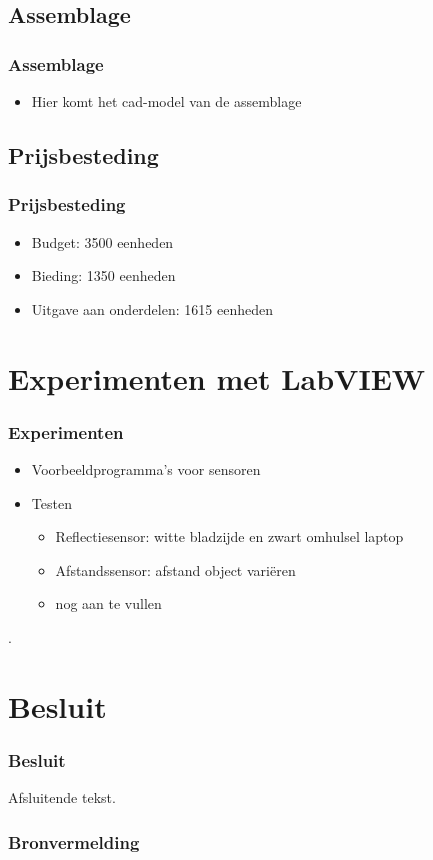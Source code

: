 \documentclass
   [kulak] %
   {kulakbeamer}
\begin{document}
\subsection{Assemblage}
\begin{frame}
	\frametitle{Assemblage}
	\begin{itemize}
		\item Hier komt het cad-model van de assemblage
	\end{itemize}
\end{frame}

\subsection{Prijsbesteding}
\begin{frame}
	\frametitle{Prijsbesteding}
	\begin{itemize}
		\item Budget: 3500 eenheden
		\item Bieding: 1350 eenheden
		\item Uitgave aan onderdelen: 1615 eenheden
	\end{itemize}
\end{frame}



\section[Experimenten]{Experimenten met LabVIEW}

\begin{frame}
	\frametitle{Experimenten}
	\begin{itemize}
		\item Voorbeeldprogramma's voor sensoren
		\item Testen
		\begin{itemize}
			\item Reflectiesensor: witte bladzijde en zwart omhulsel laptop
			\item Afstandssensor: afstand object variëren
			\item nog aan te vullen
		\end{itemize}
	\end{itemize}.
\end{frame}



\section{Besluit}
\begin{frame}
\frametitle{Besluit}
Afsluitende tekst.
\end{frame}

\begin{frame}
\frametitle{Bronvermelding}
	
	
	
\end{frame}
\end{document}
